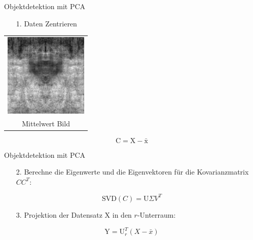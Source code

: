 \begin{frame}[t,fragile]{Objektdetektion mit  PCA}
	\begin{itemize}
 \item[1. ]{Daten Zentrieren}
  \end{itemize}
   
  \vspace{0.01em}
  {
\begin{table}
\centering
        \begin{tabular}{c}
        \includegraphics[width=4cm]{images/Segmentierung/PCA-mean}\\
        Mittelwert Bild 
         \end{tabular}
        
\end{table}
 }
\begin{equation}
\text{C} = \text{X} - \bar{\text{x}}
\end{equation}
\end{frame}

\begin{frame}[t,fragile]{Objektdetektion mit  PCA}
\begin{itemize}
 \item[2. ]{Berechne die Eigenwerte und die Eigenvektoren für die Kovarianzmatrix ${CC^T}$:}
  \end{itemize}

   \begin{equation}
\text{SVD}(C) = \text{U} \Sigma V^T 
\end{equation}

	\begin{itemize}
 \item[3. ]{Projektion der Datensatz X in den $r$-Unterraum:}
  \end{itemize}
   \begin{equation}
\text{Y}=\text{U}^{T}_{r}(X-\bar{x})
\end{equation}

\end{frame}



